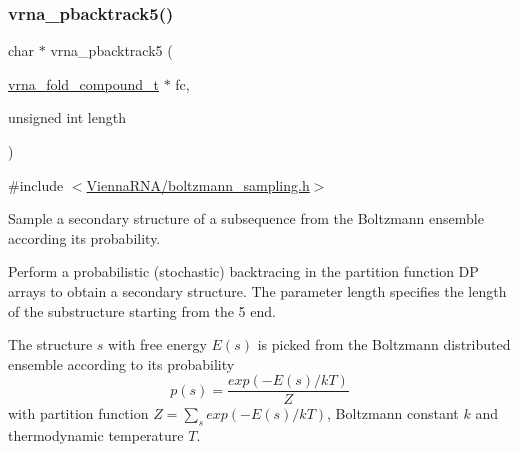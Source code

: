 \subsubsection{\texorpdfstring{vrna\_pbacktrack5()}{vrna\_pbacktrack5()}}
{\footnotesize\ttfamily char $\ast$ vrna\+\_\+pbacktrack5 (\begin{DoxyParamCaption}\item[{\mbox{\hyperlink{group__fold__compound_ga1b0cef17fd40466cef5968eaeeff6166}{vrna\+\_\+fold\+\_\+compound\+\_\+t}} $\ast$}]{fc,  }\item[{unsigned int}]{length }\end{DoxyParamCaption})}



{\ttfamily \#include $<$\mbox{\hyperlink{boltzmann__sampling_8h}{Vienna\+R\+N\+A/boltzmann\+\_\+sampling.\+h}}$>$}



Sample a secondary structure of a subsequence from the Boltzmann ensemble according its probability. 

Perform a probabilistic (stochastic) backtracing in the partition function DP arrays to obtain a secondary structure. The parameter {\ttfamily length} specifies the length of the substructure starting from the 5\textquotesingle{} end.

The structure $ s $ with free energy $ E(s) $ is picked from the Boltzmann distributed ensemble according to its probability \[ p(s) = \frac{exp(-E(s) / kT)}{Z} \] with partition function $ Z = \sum_s exp(-E(s) / kT) $, Boltzmann constant $ k $ and thermodynamic temperature $ T $.

